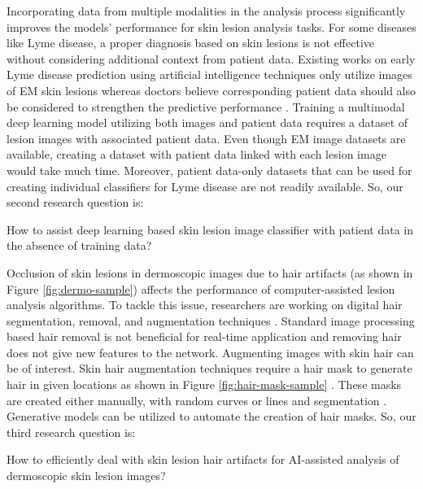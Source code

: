 Incorporating data from multiple modalities in the analysis process significantly improves the models' performance for skin lesion analysis tasks. For some diseases like Lyme disease, a proper diagnosis based on skin lesions is not effective without considering additional context from patient data. Existing works on early Lyme disease prediction using artificial intelligence techniques only utilize images of EM skin lesions whereas doctors believe corresponding patient data should also be considered to strengthen the predictive performance \cite{Burlina2020,Hossain2022}. Training a multimodal deep learning model utilizing both images and patient data requires a dataset of lesion images with associated patient data. Even though EM image datasets are available, creating a dataset with patient data linked with each lesion image would take much time. Moreover, patient data-only datasets that can be used for creating individual classifiers for Lyme disease are not readily available. So, our second research question is:
\begin{researchquestion}\label{question2}
	How to assist deep learning based skin lesion image classifier with patient data in the absence of training data?
\end{researchquestion}

Occlusion of skin lesions in dermoscopic images due to hair artifacts (as shown in Figure \ref{fig:dermo-sample}) affects the performance of computer-assisted lesion analysis algorithms. To tackle this issue, researchers are working on digital hair segmentation, removal, and augmentation techniques \cite{Attia2020,Li2021}. Standard image processing based hair removal is not beneficial for real-time application and removing hair does not give new features to the network. Augmenting images with skin hair can be of interest. Skin hair augmentation techniques require a hair mask to generate hair in given locations as shown in Figure \ref{fig:hair-mask-sample} \cite{Attia2020}. These masks are created either manually, with random curves or lines and segmentation \cite{Attia2020}. Generative models can be utilized to automate the creation of hair masks. So, our third research question is:
\begin{researchquestion}\label{question3}
	How to efficiently deal with skin lesion hair artifacts for AI-assisted analysis of dermoscopic skin lesion images?
\end{researchquestion}

